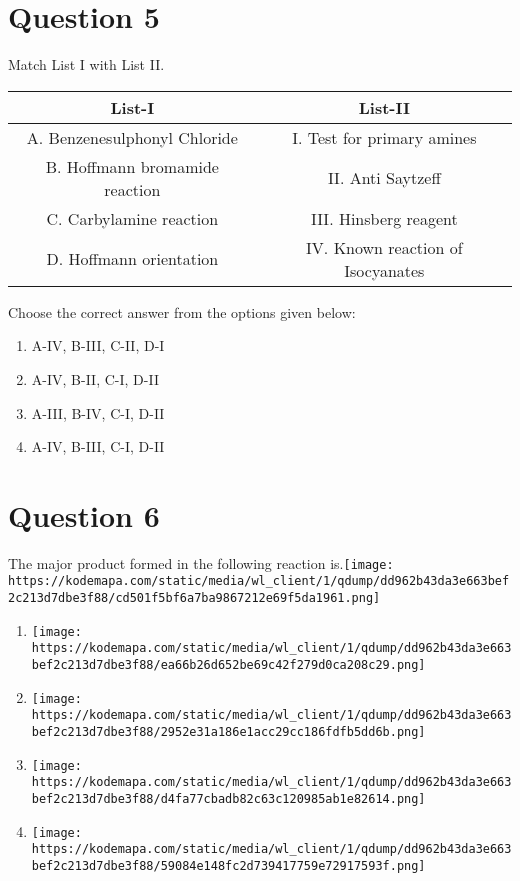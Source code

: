 \documentclass{article}
\begin{document}
\section*{Question 5}
Match List I with List II.
    \setlength{\arrayrulewidth}{1mm}
    \begin{tabular}{|c|c|}
    \hline
    List-I & List-II \\
\hline
A. Benzenesulphonyl Chloride & I. Test for primary amines \\
\hline
B. Hoffmann bromamide reaction & II. Anti Saytzeff \\
\hline
C. Carbylamine reaction & III. Hinsberg reagent \\
\hline
D. Hoffmann orientation & IV. Known reaction of Isocyanates \\
\hline

    \end{tabular}
    \setlength{\arrayrulewidth}{0.4mm}
    Choose the correct answer from the options given below: \newline
\begin{enumerate}[label=(\alph*)]
\item A-IV, B-III, C-II, D-I
\item A-IV, B-II, C-I, D-II
\item A-III, B-IV, C-I, D-II
\item A-IV, B-III, C-I, D-II
\end{enumerate}
\newpage
\section*{Question 6}
The major product formed in the following reaction is.\texttt{[image: https://kodemapa.com/static/media/wl\_client/1/qdump/dd962b43da3e663bef2c213d7dbe3f88/cd501f5bf6a7ba9867212e69f5da1961.png]}\newline
\begin{enumerate}[label=(\alph*)]
\item \texttt{[image: https://kodemapa.com/static/media/wl\_client/1/qdump/dd962b43da3e663bef2c213d7dbe3f88/ea66b26d652be69c42f279d0ca208c29.png]}
\item \texttt{[image: https://kodemapa.com/static/media/wl\_client/1/qdump/dd962b43da3e663bef2c213d7dbe3f88/2952e31a186e1acc29cc186fdfb5dd6b.png]}
\item \texttt{[image: https://kodemapa.com/static/media/wl\_client/1/qdump/dd962b43da3e663bef2c213d7dbe3f88/d4fa77cbadb82c63c120985ab1e82614.png]}
\item \texttt{[image: https://kodemapa.com/static/media/wl\_client/1/qdump/dd962b43da3e663bef2c213d7dbe3f88/59084e148fc2d739417759e72917593f.png]}
\end{enumerate}
\newpage
\end{document}
